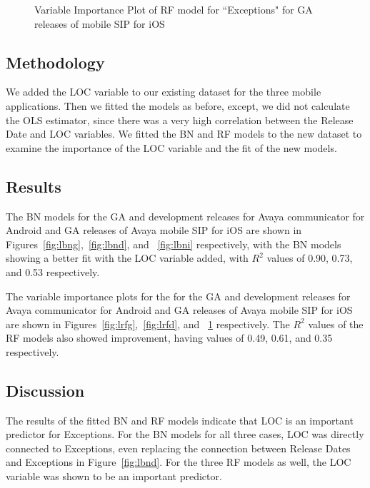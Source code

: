 \documentclass[smallcondensed]{svjour3}     %
\begin{document}
\begin{figure}[!t]
\begin{minipage}{.45\textwidth}
\caption{Variable Importance Plot of RF model for ``Exceptions" for GA releases of mobile SIP for iOS}
\label{fig:lrfi}
\end{minipage}
\end{figure}
\vspace{-10pt}


\subsection*{Methodology}
We added the LOC variable to our existing dataset for the three mobile applications. Then we fitted the models as before, except, we did not calculate the OLS estimator, since there was a very high correlation between the Release Date and LOC variables. We fitted the BN and RF models to the new dataset to examine the importance of the LOC variable and the fit of the new models.

\vspace{-20pt}
\subsection*{Results}

The BN models for the GA and development releases for Avaya communicator for Android and GA releases of Avaya mobile SIP for iOS are shown in Figures~\ref{fig:lbng},~\ref{fig:lbnd}, and ~\ref{fig:lbni} respectively, with the BN models showing a better fit with the LOC variable added, with $R^2$ values of 0.90, 0.73, and 0.53 respectively. 

The variable importance plots for the for the GA and development releases for Avaya communicator for Android and GA releases of Avaya mobile SIP for iOS are shown in Figures~\ref{fig:lrfg},~\ref{fig:lrfd}, and ~\ref{fig:lrfi} respectively. The $R^2$ values of the RF models also showed improvement, having values of 0.49, 0.61, and 0.35 respectively.

\vspace{-20pt}
\subsection*{Discussion}

The results of the fitted BN and RF models indicate that LOC is an important predictor for Exceptions. For the BN models for all three cases, LOC was directly connected to Exceptions, even replacing the connection between Release Dates and Exceptions in Figure~\ref{fig:lbnd}. For the three RF models as well, the LOC variable was shown to be an important predictor. 
\end{document}
